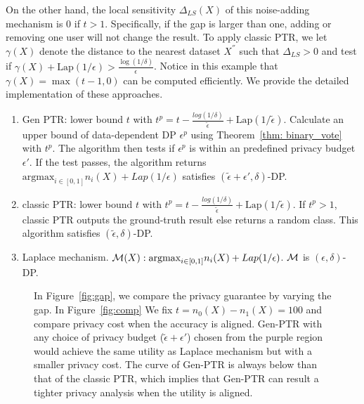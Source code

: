 On the other hand, the local sensitivity $\Delta_{LS}(X)$ of this noise-adding mechanism is $0$ if $t>1$. Specifically,  if the gap is larger than one, adding or removing one user will not change the result. To apply  classic PTR, we let  $\gamma(X)$ denote the distance to the nearest dataset $X^{''}$ such that $\Delta_{LS}>0$ and test if $\gamma(X)+\text{Lap}(1/\epsilon)> \frac{\log(1/\delta)}{\epsilon}$.
 Notice in this example that $\gamma(X)=\max(t-1, 0)$ can be computed efficiently.  
We provide the detailed implementation of these approaches.
\begin{enumerate}
    \item Gen PTR: lower bound $t$ with $t^p = t - \frac{log(1/\delta)}{\tilde{\epsilon}} + \text{Lap}(1/\tilde{\epsilon})$.
    Calculate an upper bound of data-dependent DP $\epsilon^p$ using Theorem~\ref{thm: binary_vote} with $t^p$. The algorithm then tests if $\epsilon^p$ is within an predefined privacy budget $\epsilon'$. If the test passes, the algorithm
    returns $\text{argmax}_{i \in [0,1]} n_i(X)+ Lap(1/\epsilon)$ satisfies $(\tilde{\epsilon}+\epsilon', \delta)$-DP.
    \item classic PTR: lower bound $t$ with $t^p = t - \frac{log(1/\delta)}{\tilde{\epsilon}} + \text{Lap}(1/\tilde{\epsilon})$. If $t^p>1$,  classic PTR outputs the ground-truth result else returns a random class. This algorithm satisfies $(\tilde{\epsilon}, \delta)$-DP.
    \item Laplace mechanism. $\mathcal{M}(X): \text{argmax}_{i \in [0,1]} n_i(X)+ Lap(1/\epsilon)$. $\mathcal{M}$ is $(\epsilon, \delta)$-DP.
\end{enumerate}
\begin{figure*}[t]
	\centering		{}	
	\caption{In Figure~\ref{fig:gap}, we compare the privacy guarantee by varying the gap. In Figure~\ref{fig:comp} We fix $t=n_0(X)-n_1(X)=100$ and compare privacy cost when the accuracy is aligned. 
	 Gen-PTR with any choice of privacy budget ($\tilde{\epsilon}+\epsilon'$) chosen from the purple region would achieve the same utility as Laplace mechanism but with a smaller privacy cost. The curve of Gen-PTR is always below than that of the classic PTR, which implies that Gen-PTR can result a tighter privacy analysis when the utility is aligned. } 
\end{figure*}

